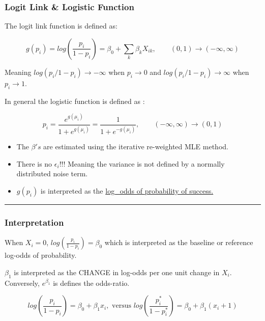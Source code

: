 \documentclass[
  letterpaper,
  DIV=11,
  numbers=noendperiod]{scrreprt}
\begin{document}
\hypertarget{logit-link-logistic-function}{%
\subsubsection*{Logit Link \& Logistic
Function}\label{logit-link-logistic-function}}

The logit link function is defined as:

\[
g(p_i) = log\left(\frac{p_i}{1-p_i}\right) = \beta_0 + \sum_k \beta_k X_{ik}, \qquad (0,1) \rightarrow (-\infty, \infty)
\]

Meaning \(log(p_i/1-p_i) \rightarrow -\infty\) when
\(p_i \rightarrow 0\) and \(log(p_i/1-p_i)\rightarrow \infty\) when
\(p_i \rightarrow 1\).

In general the logistic function is defined as :

\[
p_i = \frac{e^{g(\mu_i)}}{1 + e^{g(\mu_i)}} = \frac{1}{1+ e^{-g(\mu_i)}}, \qquad (-\infty, \infty) \rightarrow (0,1)
\]

\begin{itemize}
\item
  The \(\beta's\) are estimated using the iterative re-weighted MLE
  method.
\item
  There is no \(\epsilon_i\)!!! Meaning the variance is not defined by a
  normally distributed noise term.
\item
  \(g(p_i)\) is interpreted as the \ul{log\_odds of probability of
  success.}
\end{itemize}

\begin{center}\rule{0.5\linewidth}{0.5pt}\end{center}

\hypertarget{interpretation}{%
\subsubsection*{Interpretation}\label{interpretation}}

When \(X_i=0\), \(log(\frac{p_i}{1-p_i}) = \beta_0\) which is
interpreted as the baseline or reference log-odds of probability.

\(\beta_1\) is interpreted as the CHANGE in log-odds per one unit change
in \(X_i\). Conversely, \(e^{\beta_1}\) is defines the odds-ratio.

\[
log(\frac{p_i}{1-p_i}) = \beta_0 + \beta_1 x_i, \text{ versus } log(\frac{p^*_i}{1-p^*_i}) = \beta_0 + \beta_1 (x_i + 1)
\]
\end{document}
